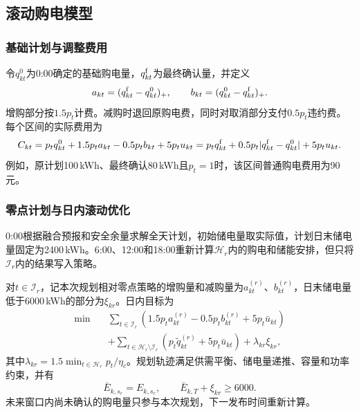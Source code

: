 \subsection{滚动购电模型}

\subsubsection{基础计划与调整费用}

令$q_{kt}^{0}$为0:00确定的基础购电量，$q_{kt}^{\rm f}$为最终确认量，并定义
\begin{equation}
 a_{kt}=(q_{kt}^{\rm f}-q_{kt}^{0})_+,
 \qquad b_{kt}=(q_{kt}^{0}-q_{kt}^{\rm f})_+.
 \label{eq:q3-adjustment}
\end{equation}
增购部分按$1.5p_t$计费。减购时退回原购电费，同时对取消部分支付$0.5p_t$违约费。每个区间的实际费用为
\begin{equation}
 C_{kt}=p_tq_{kt}^{0}+1.5p_ta_{kt}-0.5p_tb_{kt}+5p_tu_{kt}
 =p_tq_{kt}^{\rm f}+0.5p_t\lvert q_{kt}^{\rm f}-q_{kt}^{0}\rvert+5p_tu_{kt}.
 \label{eq:q3-actual-cost}
\end{equation}
例如，原计划100\,kWh、最终确认80\,kWh且$p_t=1$时，该区间普通购电费用为90元。

\subsubsection{零点计划与日内滚动优化}

0:00根据融合预报和安全余量求解全天计划，初始储电量取实际值，计划日末储电量固定为2400\,kWh。6:00、12:00和18:00重新计算$\mathcal H_r$内的购电和储能安排，但只将$\mathcal I_r$内的结果写入策略。

对$t\in\mathcal I_r$，记本次规划相对零点策略的增购量和减购量为$a_{kt}^{(r)}$、$b_{kt}^{(r)}$，日末储电量低于6000\,kWh的部分为$\xi_{kr}$。日内目标为
\begin{equation}
\begin{aligned}
 \min\quad
 &\sum_{t\in\mathcal I_r}\left(1.5p_ta_{kt}^{(r)}-0.5p_tb_{kt}^{(r)}+5p_t\bar u_{kt}\right)\\
 &+\sum_{t\in\mathcal H_r\setminus\mathcal I_r}
 \left(p_t\widetilde q_{kt}^{(r)}+5p_t\bar u_{kt}\right)
 +\lambda_{kr}\xi_{kr},
\end{aligned}
\label{eq:q3-rolling-objective}
\end{equation}
其中$\lambda_{kr}=1.5\min_{t\in\mathcal H_r}p_t/\eta_c$。规划轨迹满足供需平衡、储电量递推、容量和功率约束，并有
\begin{equation}
 \bar E_{k,s_r}=E_{k,s_r},\qquad
 \bar E_{k,T}+\xi_{kr}\ge6000.
 \label{eq:q3-physical}
\end{equation}
未来窗口内尚未确认的购电量只参与本次规划，下一发布时间重新计算。

